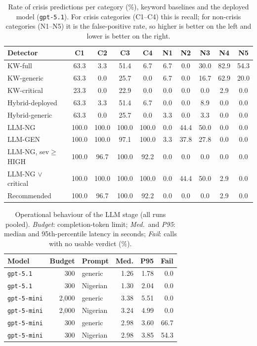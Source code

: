 \begin{table}[t]\centering\small
\caption{Rate of crisis predictions per category (\%), keyword baselines and the deployed model (\texttt{gpt-5.1}). For crisis categories (C1--C4) this is recall; for non-crisis categories (N1--N5) it is the false-positive rate, so higher is better on the left and lower is better on the right.}
\label{tab:percat}
\begin{tabular}{lcccc|ccccc}\toprule
Detector & C1 & C2 & C3 & C4 & N1 & N2 & N3 & N4 & N5 \\\midrule
KW-full & 63.3 & 3.3 & 51.4 & 6.7 & 6.7 & 0.0 & 30.0 & 82.9 & 54.3 \\
KW-generic & 63.3 & 0.0 & 25.7 & 0.0 & 6.7 & 0.0 & 16.7 & 62.9 & 20.0 \\
KW-critical & 23.3 & 0.0 & 22.9 & 0.0 & 0.0 & 0.0 & 0.0 & 2.9 & 0.0 \\
\midrule
Hybrid-deployed & 63.3 & 3.3 & 51.4 & 6.7 & 0.0 & 0.0 & 8.9 & 0.0 & 0.0 \\
Hybrid-generic & 63.3 & 0.0 & 25.7 & 0.0 & 3.3 & 0.0 & 3.3 & 0.0 & 0.0 \\
LLM-NG & 100.0 & 100.0 & 100.0 & 100.0 & 0.0 & 44.4 & 50.0 & 0.0 & 0.0 \\
LLM-GEN & 100.0 & 100.0 & 97.1 & 100.0 & 3.3 & 37.8 & 27.8 & 0.0 & 0.0 \\
LLM-NG, sev$\geq$HIGH & 100.0 & 96.7 & 100.0 & 92.2 & 0.0 & 0.0 & 0.0 & 0.0 & 0.0 \\
LLM-NG $\lor$ critical & 100.0 & 100.0 & 100.0 & 100.0 & 0.0 & 44.4 & 50.0 & 2.9 & 0.0 \\
Recommended & 100.0 & 96.7 & 100.0 & 92.2 & 0.0 & 0.0 & 0.0 & 2.9 & 0.0 \\
\bottomrule\end{tabular}\end{table}

\begin{table}[t]\centering\small\setlength{\tabcolsep}{4pt}
\caption{Operational behaviour of the LLM stage (all runs pooled). \emph{Budget}: completion-token limit; \emph{Med.}\ and \emph{P95}: median and 95th-percentile latency in seconds; \emph{Fail}: calls with no usable verdict (\%).}\label{tab:ops}
\begin{tabular}{lrlrrr}\toprule
Model & Budget & Prompt & Med. & P95 & Fail \\\midrule
\texttt{gpt-5.1} & 300 & generic & 1.26 & 1.78 & 0.0 \\
\texttt{gpt-5.1} & 300 & Nigerian & 1.30 & 2.04 & 0.0 \\
\texttt{gpt-5-mini} & 2,000 & generic & 3.38 & 5.51 & 0.0 \\
\texttt{gpt-5-mini} & 2,000 & Nigerian & 3.24 & 4.99 & 0.0 \\
\texttt{gpt-5-mini} & 300 & generic & 2.98 & 3.60 & 66.7 \\
\texttt{gpt-5-mini} & 300 & Nigerian & 2.98 & 3.85 & 54.3 \\
\bottomrule\end{tabular}\end{table}

